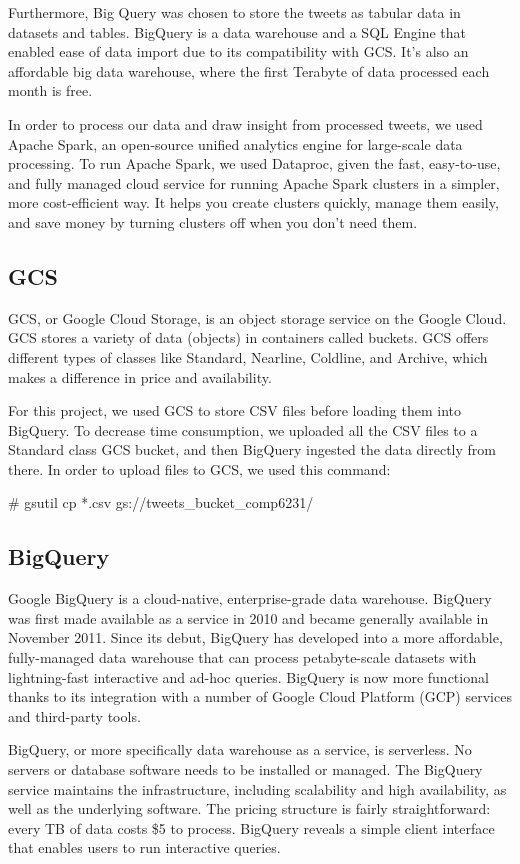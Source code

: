 \documentclass[a4paper,12pt]{article}
\begin{document}
Furthermore, Big Query was chosen to store the tweets as tabular data in datasets and tables. BigQuery is a data warehouse
and a SQL Engine that enabled ease of data import due to its compatibility with GCS. It's also an affordable big data
warehouse, where the first Terabyte of data processed each month is free.

In order to process our data and draw insight from processed tweets, we used Apache Spark, an open-source unified analytics engine for
large-scale data processing. To run Apache Spark, we used Dataproc, given the fast, easy-to-use, and fully managed cloud
service for running Apache Spark clusters in a simpler, more cost-efficient way. It helps you create clusters quickly,
manage them easily, and save money by turning clusters off when you don't need them.

\subsection{GCS}
GCS, or Google Cloud Storage\cite{GCS}, is an object storage service on the Google Cloud. GCS stores a variety of data
(objects) in containers called buckets. GCS offers different types of classes like Standard, Nearline, Coldline, and
Archive, which makes a difference in price and availability\cite{GCSClasses}.

For this project, we used GCS to store CSV files before loading them into  BigQuery. To decrease time consumption, we uploaded all the CSV files to
a Standard class GCS bucket, and then BigQuery ingested the data directly from there. In order to upload files to GCS, we used this command:

\# gsutil cp *.csv gs://tweets\_bucket\_comp6231/

\subsection{BigQuery}
Google BigQuery is a cloud-native, enterprise-grade data warehouse. BigQuery was first made available as a service in
2010 and became generally available in November 2011. Since its debut, BigQuery has developed into a more affordable,
fully-managed data warehouse that can process petabyte-scale datasets with lightning-fast interactive and ad-hoc queries.
BigQuery is now more functional thanks to its integration with a number of Google Cloud Platform (GCP) services and
third-party tools.

BigQuery, or more specifically data warehouse as a service, is serverless. No servers or database software needs to be
installed or managed. The BigQuery service maintains the infrastructure, including scalability and high availability,
as well as the underlying software. The pricing structure is fairly straightforward: every TB of data costs \$5 to process. BigQuery reveals a simple client interface that enables users to run interactive queries.
\end{document}
